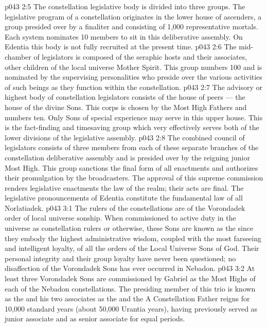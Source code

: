\vs p043 2:5 \pc The constellation legislative body is divided into three groups. The legislative program of a constellation originates in the lower house of ascenders, a group presided over by a finaliter and consisting of 1,000 representative mortals. Each system nominates 10 members to sit in this deliberative assembly. On Edentia this body is not fully recruited at the present time.
\vs p043 2:6 The mid\hyp{}chamber of legislators is composed of the seraphic hosts and their associates, other children of the local universe Mother Spirit. This group numbers 100 and is nominated by the supervising personalities who preside over the various activities of such beings as they function within the constellation.
\vs p043 2:7 The advisory or highest body of constellation legislators consists of the house of peers --- the house of the divine Sons. This corps is chosen by the Most High Fathers and numbers ten. Only Sons of special experience may serve in this upper house. This is the fact\hyp{}finding and timesaving group which very effectively serves both of the lower divisions of the legislative assembly.
\vs p043 2:8 The combined council of legislators consists of three members from each of these separate branches of the constellation deliberative assembly and is presided over by the reigning junior Most High. This group sanctions the final form of all enactments and authorizes their promulgation by the broadcasters. The approval of this supreme commission renders legislative enactments the law of the realm; their acts are final. The legislative pronouncements of Edentia constitute the fundamental law of all Norlatiadek.
\vs p043 3:1 The rulers of the constellations are of the Vorondadek order of local universe sonship. When commissioned to active duty in the universe as constellation rulers or otherwise, these Sons are known as the  since they embody the highest administrative wisdom, coupled with the most farseeing and intelligent loyalty, of all the orders of the Local Universe Sons of God. Their personal integrity and their group loyalty have never been questioned; no disaffection of the Vorondadek Sons has ever occurred in Nebadon.
\vs p043 3:2 \pc At least three Vorondadek Sons are commissioned by Gabriel as the Most Highs of each of the Nebadon constellations. The presiding member of this trio is known as the  and his two associates as the  and the  A Constellation Father reigns for 10,000 standard years (about 50,000 Urantia years), having previously served as junior associate and as senior associate for equal periods.
